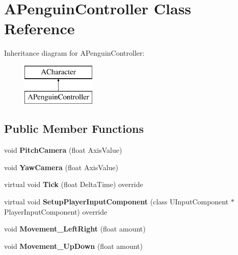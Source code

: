 \hypertarget{class_a_penguin_controller}{}\section{A\+Penguin\+Controller Class Reference}
\label{class_a_penguin_controller}
Inheritance diagram for A\+Penguin\+Controller\+:\begin{figure}[H]
\begin{center}
\leavevmode
\includegraphics[height=2.000000cm]{class_a_penguin_controller}
\end{center}
\end{figure}
\subsection*{Public Member Functions}
\begin{DoxyCompactItemize}
\item 
\mbox{\label{class_a_penguin_controller_a473b0f8a34d61b6741d1af6a9d76feef}} 
void {\bfseries Pitch\+Camera} (float Axis\+Value)
\item 
\mbox{\label{class_a_penguin_controller_a728d5fe6aea42d8c0b44e136265b2960}} 
void {\bfseries Yaw\+Camera} (float Axis\+Value)
\item 
\mbox{\label{class_a_penguin_controller_a89357a5a41897aae83fe07bd9672fd56}} 
virtual void {\bfseries Tick} (float Delta\+Time) override
\item 
\mbox{\label{class_a_penguin_controller_a5d0ea623d8cae41f21ebd27f4e99fb70}} 
virtual void {\bfseries Setup\+Player\+Input\+Component} (class U\+Input\+Component $\ast$Player\+Input\+Component) override
\item 
\mbox{\label{class_a_penguin_controller_a4788c1ac82ad6ba574d2fd3bb5ee6f31}} 
void {\bfseries Movement\+\_\+\+Left\+Right} (float amount)
\item 
\mbox{\label{class_a_penguin_controller_a39cf1cd452a842a3241a53d053934544}} 
void {\bfseries Movement\+\_\+\+Up\+Down} (float amount)
\end{DoxyCompactItemize}
